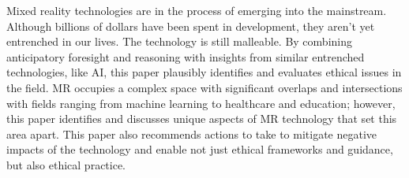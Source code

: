 Mixed reality technologies are in the process of emerging into the mainstream. Although billions of dollars have been spent in development, they aren't yet entrenched in our lives. The technology is still malleable. By combining anticipatory foresight and reasoning with insights from similar entrenched technologies, like AI, this paper plausibly identifies and evaluates ethical issues in the field. MR occupies a complex space with significant overlaps and intersections with fields ranging from machine learning to healthcare and education; however, this paper identifies and discusses unique aspects of MR technology that set this area apart. This paper also recommends actions to take to mitigate negative impacts of the technology and enable not just ethical frameworks and guidance, but also ethical practice.

